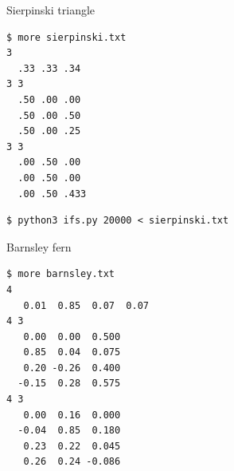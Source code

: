 \documentclass[8pt,a4paper,compress]{beamer}
\begin{document}
\begin{frame}[fragile]
\pause

Sierpinski triangle

\begin{minipage}{160pt}
\begin{lstlisting}[language={},style=focusin]
$ more sierpinski.txt
3   
  .33 .33 .34 
3 3 
  .50 .00 .00 
  .50 .00 .50 
  .50 .00 .25 
3 3 
  .00 .50 .00 
  .00 .50 .00 
  .00 .50 .433 
\end{lstlisting}

\begin{lstlisting}[language={},style=focusin]
$ python3 ifs.py 20000 < sierpinski.txt
\end{lstlisting}
\end{minipage}%
\begin{minipage}{140pt}
\begin{center}
\hfill {}
\end{center}
\end{minipage}

\pause
\bigskip

Barnsley fern

\begin{minipage}{160pt}
\begin{lstlisting}[language={},style=focusin]
$ more barnsley.txt
4
   0.01  0.85  0.07  0.07
4 3
   0.00  0.00  0.500
   0.85  0.04  0.075
   0.20 -0.26  0.400
  -0.15  0.28  0.575
4 3
   0.00  0.16  0.000
  -0.04  0.85  0.180
   0.23  0.22  0.045
   0.26  0.24 -0.086
\end{lstlisting}


\end{minipage}
\end{frame}
\end{document}
